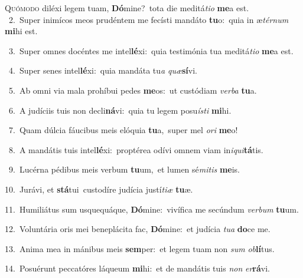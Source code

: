 \lettrine{\initial\textcolor{\initialcolor}{Q}}{uómodo} diléxi legem tuam, \textbf{Dó}\-mine?~\star tota die meditá\-\textit{ti}\-\textit{o} \textbf{me}\-a est.\\
{\numbfont\textcolor{\numbcolor}{~2.}}~Super inimícos meos prudéntem me fecísti mandáto \textbf{tu}\-o:~\star quia in æ\-\textit{tér}\-\textit{num} \textbf{mi}\-hi est.\par
{\numbfont\textcolor{\numbcolor}{~3.}}~Super omnes docéntes me intel\-\textbf{lé}\-xi:~\star quia testimónia tua meditá\-\textit{ti}\-\textit{o} \textbf{me}\-a est.\par
{\numbfont\textcolor{\numbcolor}{~4.}}~Super senes intel\-\textbf{lé}\-xi:~\star quia mandáta tu\textit{a} \textit{quæ}\-\textbf{sí}vi.\par
{\numbfont\textcolor{\numbcolor}{~5.}}~Ab omni via mala prohíbui pedes \textbf{me}\-os:~\star ut custódiam \textit{ver}\-\textit{ba} \textbf{tu}\-a.\par
{\numbfont\textcolor{\numbcolor}{~6.}}~A judíciis tuis non decli\-\textbf{ná}\-vi:~\star quia tu legem posu\-\textit{ís}\-\textit{ti} \textbf{mi}\-hi.\par
{\numbfont\textcolor{\numbcolor}{~7.}}~Quam dúlcia fáucibus meis elóquia \textbf{tu}\-a,~\star super mel \textit{o}\-\textit{ri} \textbf{me}\-o!\par
{\numbfont\textcolor{\numbcolor}{~8.}}~A mandátis tuis intel\-\textbf{lé}\-xi:~\star proptérea odívi omnem viam in\-\textit{i}\-\textit{qui}\textbf{tá}tis.\par
{\numbfont\textcolor{\numbcolor}{~9.}}~Lucérna pédibus meis verbum \textbf{tu}\-um,~\star et lumen sé\-\textit{mi}\-\textit{tis} \textbf{me}\-is.\par
{\numbfont\textcolor{\numbcolor}{10.}}~Jurávi, et \textbf{stá}\-tui~\star custodíre judícia justí\-\textit{ti}\-\textit{æ} \textbf{tu}\-æ.\par
{\numbfont\textcolor{\numbcolor}{11.}}~Humiliátus sum usquequáque, \textbf{Dó}\-mine:~\star vivífica me secúndum \textit{ver}\-\textit{bum} \textbf{tu}\-um.\par
{\numbfont\textcolor{\numbcolor}{12.}}~Voluntária oris mei beneplácita fac, \textbf{Dó}\-mine:~\star et judícia \textit{tu}\-\textit{a} \textbf{do}\-ce me.\par
{\numbfont\textcolor{\numbcolor}{13.}}~Anima mea in mánibus meis \textbf{sem}\-per:~\star et legem tuam non \textit{sum} \textit{ob}\-\textbf{lí}tus.\par
{\numbfont\textcolor{\numbcolor}{14.}}~Posuérunt peccatóres láqueum \textbf{mi}\-hi:~\star et de mandátis tuis \textit{non} \textit{er}\-\textbf{rá}vi.\par
